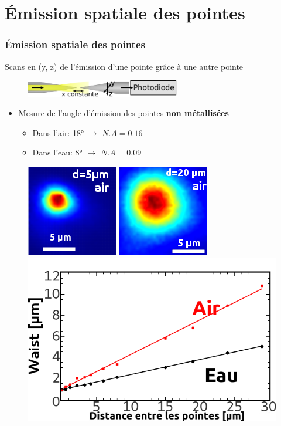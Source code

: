 \documentclass[9pt,a9paper,handout]{beamer}
\begin{document}
\section{Émission spatiale des pointes}
    \begin{frame}
        \frametitle{Émission spatiale des pointes}
        Scans en (y, z) de l'émission d'une pointe grâce à une autre pointe
        \begin{figure}[c]\centering
            \includegraphics[width=0.6\textwidth]{Images/Schemas/FibresScan}
        \end{figure}
        \vspace*{1mm}
        \begin{itemize}
            \item Mesure de l'angle d'émission des pointes \textbf{non métallisées}
            \begin{itemize}
                \item Dans l'air: 18\si{\degree} $\rightarrow$ $N.A=0.16$
                \item Dans l'eau:  8\si{\degree} $\rightarrow$ $N.A=0.09$
            \end{itemize}
        \end{itemize}
        \vspace*{-6mm}
        \begin{figure}[c]\flushright
            \includegraphics[height=0.15\textwidth]{Images/Scans/Spot_small}
            \quad
            \includegraphics[height=0.15\textwidth]{Images/Scans/Spot_big}
            \quad
            \includegraphics[height=0.20\textwidth]{Images/Scans/NuesDistanceWaist}\\

\end{figure}
\end{frame}
\end{document}
